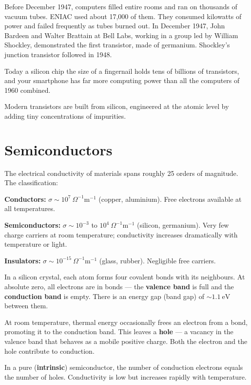 Before December 1947, computers filled entire rooms and ran on
thousands of vacuum tubes. ENIAC used about 17,000 of them. They
consumed kilowatts of power and failed frequently as tubes burned
out. In December 1947, John Bardeen and Walter Brattain at Bell Labs,
working in a group led by William Shockley, demonstrated the first
transistor, made of germanium. Shockley's junction transistor
followed in 1948.

Today a silicon chip the size of a fingernail holds tens of billions
of transistors, and your smartphone has far more computing power than
all the computers of 1960 combined.

Modern transistors are built from silicon, engineered at the atomic
level by adding tiny concentrations of impurities.

\section{Semiconductors}

\begin{definitionbox}
The electrical conductivity of materials spans
roughly 25 orders of magnitude. The classification:

\textbf{Conductors:} $\sigma \sim 10^7\ \Omega^{-1}\text{m}^{-1}$
(copper, aluminium). Free electrons available at
all temperatures.

\textbf{Semiconductors:} $\sigma \sim 10^{-3}$
to $10^4\ \Omega^{-1}\text{m}^{-1}$ (silicon,
germanium). Very few charge carriers at room
temperature; conductivity increases dramatically
with temperature or light.

\textbf{Insulators:} $\sigma \sim 10^{-15}\ \Omega^{-1}\text{m}^{-1}$
(glass, rubber). Negligible free carriers.
\end{definitionbox}

\begin{processbox}
In a silicon crystal, each atom forms four covalent
bonds with its neighbours. At absolute zero, all
electrons are in bonds --- the \textbf{valence band}
is full and the \textbf{conduction band} is empty.
There is an energy gap (band gap) of $\sim 1.1\ \text{eV}$
between them.

At room temperature, thermal energy occasionally
frees an electron from a bond, promoting it to the
conduction band. This leaves a \textbf{hole} ---
a vacancy in the valence band that behaves as a
mobile positive charge. Both the electron and the
hole contribute to conduction.

In a pure (\textbf{intrinsic}) semiconductor, the
number of conduction electrons equals the number of
holes. Conductivity is low but increases rapidly
with temperature.
\end{processbox}

